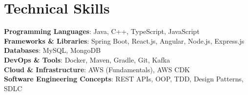 \section{Technical Skills}
\begin{itemize}[leftmargin=0.15in, label={}]
    \small{\item{
        \textbf{Programming Languages}{: Java, C++, TypeScript, JavaScript} \\
        \textbf{Frameworks \& Libraries}{: Spring Boot, React.js, Angular, Node.js, Express.js} \\
        \textbf{Databases}{: MySQL, MongoDB} \\
        \textbf{DevOps \& Tools}{: Docker, Maven, Gradle, Git, Kafka} \\
        \textbf{Cloud \& Infrastructure}{: AWS (Fundamentals), AWS CDK} \\
        \textbf{Software Engineering Concepts}{: REST APIs, OOP, TDD, Design Patterns, SDLC}
    }}
\end{itemize}
